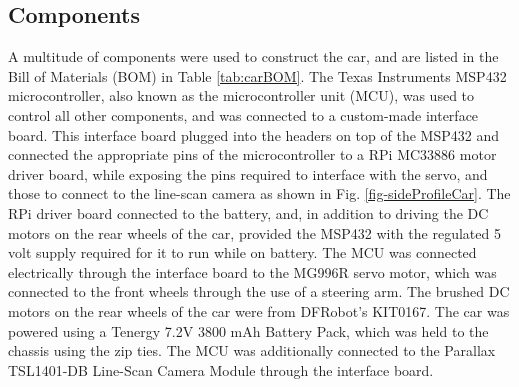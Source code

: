 \documentclass{article}
\begin{document}
\subsection{Components}
A multitude of components were used to construct the car, and are listed in the Bill of Materials (BOM) in Table \ref{tab:carBOM}. The Texas Instruments MSP432 microcontroller, also known as the microcontroller unit (MCU), was used to control all other components, and was connected to a custom-made interface board. This interface board plugged into the headers on top of the MSP432 and connected the appropriate pins of the microcontroller to a RPi MC33886 motor driver board, while exposing the pins required to interface with the servo, and those to connect to the line-scan camera as shown in Fig. \ref{fig-sideProfileCar}. The RPi driver board connected to the battery, and, in addition to driving the DC motors on the rear wheels of the car, provided the MSP432 with the regulated 5 volt supply required for it to run while on battery. The MCU was connected electrically through the interface board to the MG996R servo motor, which was connected to the front wheels through the use of a steering arm. The brushed DC motors on the rear wheels of the car were from DFRobot's KIT0167. The car was powered using a Tenergy 7.2V 3800 mAh Battery Pack, which was held to the chassis using the zip ties. The MCU was additionally connected to the Parallax TSL1401-DB Line-Scan Camera Module through the interface board.
\end{document}
